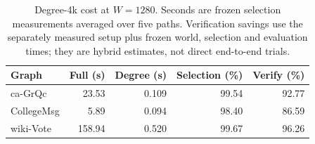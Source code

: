 \begin{table}[htbp]
\caption{Degree-4k cost at $W=1280$. Seconds are frozen selection measurements averaged over five paths. Verification savings use the separately measured setup plus frozen world, selection and evaluation times; they are hybrid estimates, not direct end-to-end trials.}\label{tab:cost}
\begin{tabular}{lrrrr}
\toprule
Graph & Full (s) & Degree (s) & Selection (\%) & Verify (\%) \\
\midrule
ca-GrQc & 23.53 & 0.109 & 99.54 & 92.77 \\
CollegeMsg & 5.89 & 0.094 & 98.40 & 86.59 \\
wiki-Vote & 158.94 & 0.520 & 99.67 & 96.26 \\
\bottomrule
\end{tabular}
\end{table}
